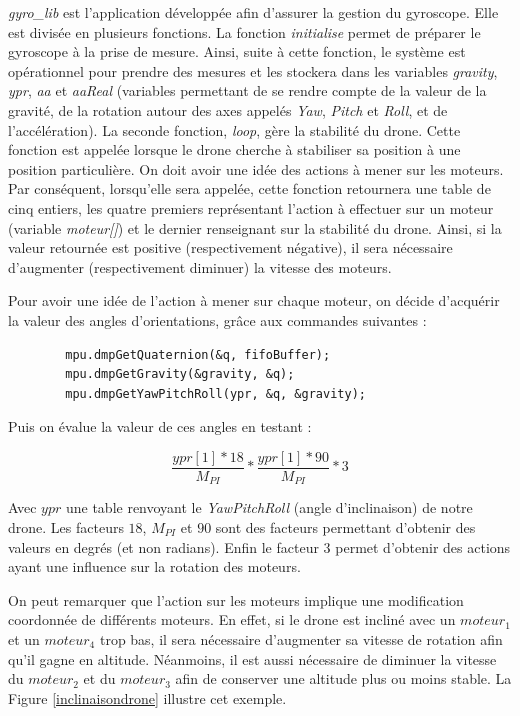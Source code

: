 \documentclass[a4paper,10pt]{report}
\begin{document}
	  \textit{gyro\_lib} est l'application développée afin d'assurer la 
gestion du gyroscope. Elle est divisée en plusieurs fonctions. La fonction 
\textit{initialise} permet de préparer le gyroscope à la prise de mesure. 
Ainsi, suite à cette fonction, le système est opérationnel pour prendre des 
mesures et les stockera dans les variables \textit{gravity}, \textit{ypr}, 
\textit{aa} et \textit{aaReal} (variables permettant de se rendre 
compte de la valeur de la gravité, de la rotation autour des axes appelés 
\textit{Yaw}, \textit{Pitch} et \textit{Roll}, et de l'accélération). La 
seconde fonction, \textit{loop},  gère la stabilité du drone. Cette fonction 
est appelée lorsque le drone cherche à stabiliser sa position à une position 
particulière. On doit avoir une idée des actions à mener sur les moteurs. Par 
conséquent, lorsqu'elle sera appelée, cette fonction retournera une table de 
cinq entiers, les quatre premiers représentant l'action à effectuer sur un 
moteur (variable \textit{moteur[]}) et le dernier renseignant sur la stabilité 
du drone. Ainsi, si la valeur retournée est positive (respectivement négative), 
il sera nécessaire d'augmenter (respectivement diminuer) la vitesse des 
moteurs. 

	  Pour avoir une idée de l'action à mener sur chaque moteur, on décide 
d'acquérir la valeur des angles d'orientations, grâce aux commandes suivantes : 

	  \begin{verbatim}
	    mpu.dmpGetQuaternion(&q, fifoBuffer);
	    mpu.dmpGetGravity(&gravity, &q);
	    mpu.dmpGetYawPitchRoll(ypr, &q, &gravity);
	  \end{verbatim}

	  Puis on évalue la valeur de ces angles en testant :
	  
	  \begin{equation}
	    \frac{ypr[1] * 18}{M_{PI}} * \frac{ypr[1] * 90}{M_{PI}} * 3
	  \end{equation}

	  Avec $ypr$ une table renvoyant le \textit{YawPitchRoll} (angle 
d'inclinaison) de notre drone. Les facteurs $18$, $M_{PI}$ et $90$ sont des 
facteurs permettant d'obtenir des valeurs en degrés (et non radians). Enfin le 
facteur $3$ permet d'obtenir des actions ayant une influence sur la rotation 
des moteurs. 

	  On peut remarquer que l'action sur les moteurs implique une 
modification coordonnée de différents moteurs. En effet, si le drone est incliné 
avec un $moteur_1$ et un $moteur_4$ trop bas, il sera nécessaire d'augmenter sa 
vitesse de rotation afin qu'il gagne en altitude. Néanmoins, il est aussi 
nécessaire de diminuer la vitesse du $moteur_2$ et du $moteur_3$ afin de 
conserver une altitude plus ou moins stable. La Figure \ref{inclinaisondrone} 
illustre cet exemple.
\end{document}
